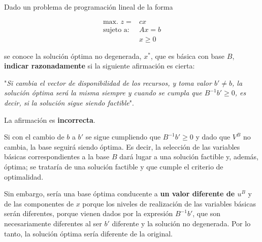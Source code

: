 Dado un problema de programación lineal de la forma 

\begin{align}
    \mbox{max. } z = & cx \\
    \mbox{sujeto a: }
    & Ax = b \\
    & x \geq 0
\end{align}

\noindent se conoce la solución óptima no degenerada, $x^*$, que es básica con base $B$, \textbf{indicar razonadamente} si la siguiente afirmación es cierta:

\noindent "\textit{Si cambia el vector de disponibilidad de los recursos, y toma valor $b'\neq b$, la solución óptima será la misma siempre y cuando se cumpla que $B^{-1}b'\geq 0$, es decir, si la solución sigue siendo factible}".

\vspace{1cm}

La afirmación es \textbf{incorrecta}. 

Si con el cambio de $b$ a $b'$ se sigue cumpliendo que $B^{-1}b'\geq 0$ y dado que $V^B$ no cambia, la base seguirá siendo óptima. Es decir, la selección de las variables básicas correspondientes a la base $B$ dará lugar a una solución factible y, además, óptima; se trataría de una solución factible y que cumple el criterio de optimalidad.

Sin embargo, sería una base óptima conducente a \textbf{un valor diferente de $u^B$} y de las componentes de $x$ porque los niveles de realización de las variables básicas serán diferentes, porque vienen dados por la expresión $B^{-1}b'$, que son necesariamente diferentes al ser $b'$ diferente y la solución no degenerada. Por lo tanto, la solución óptima sería diferente de la original.





